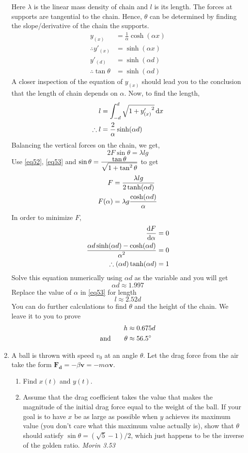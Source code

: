 \begin{enumerate}
Here $\lambda$ is the linear mass density of chain and $l$ is its length. The forces at supports are tangential to the chain. Hence, $\theta$ can be determined by finding the slope/derivative of the chain the supports.
\begin{align}
y_{(x)}&=\frac{1}{\alpha}\cosh(\alpha x) \nonumber\\
\therefore y'_{(x)}&=\sinh(\alpha x) \nonumber\\
y'_{(d)}&=\sinh(\alpha d) \nonumber\\
\therefore \tan \theta&=\sinh(\alpha d)		\label{eq52}
\end{align}
A closer inspection of the equation of $y_{(x)}$ should lead you to the conclusion that the length of chain depends on $\alpha$. Now, to find the length,
\begin{align}
l&=\int_{-d}^d \sqrt{1+{y'_{(x)}}^2} \mathop{}\!\mathrm{d} x \nonumber\\
\therefore l&=\frac{2}{\alpha} \sinh(\alpha d)		\label{eq53}
\end{align}
Balancing the vertical forces on the chain, we get,
\[
2F\sin\theta=\lambda lg
\]
Use \eqref{eq52}, \eqref{eq53} and $\sin\theta=\frac{\displaystyle \tan\theta}{\displaystyle \sqrt{1+\tan^2\theta}}$ to get
\begin{align*}
F&=\frac{\displaystyle \lambda lg}{\displaystyle 2\tanh(\alpha d)}\\
F(\alpha)&=\lambda g\frac{\displaystyle \cosh(\alpha d)}{\displaystyle \alpha}
\end{align*}
In order to minimize $F$,
\begin{align*}
\frac{\mathop{}\!\mathrm{d} F}{\mathop{}\!\mathrm{d} \alpha} &= 0\\
\frac{\displaystyle \alpha d\sinh(\alpha d)-\cosh(\alpha d)}{\displaystyle \alpha^2}&=0\\
\therefore (\alpha d)\tanh(\alpha d)&=1
\end{align*}
Solve this equation numerically using $\alpha d$ as the variable and you will get
\[
\alpha d \approx 1.997
\]
Replace the value of $\alpha$ in \eqref{eq53} for length
\[
l\approx 2.52d
\]
You can do further calculations to find $\theta$ and the height of the chain. We leave it to you to prove
\begin{align*}
h &\approx 0.675d\\
\text{and} \qquad \theta &\approx 56.5\degree
\end{align*}

\item A ball is thrown with speed $v_0$ at an angle $\theta$. Let the drag force from the air take the form $\bm{F_d}=-\beta\bm{v}=-m\alpha\bm{v}$.
\begin{enumerate}
\item Find $x{(t)}$ and $y{(t)}$.
\item Assume that the drag coefficient takes the value that makes the magnitude of the initial drag force equal to the weight of the ball. If your goal is to have $x$ be as large as possible when $y$ achieves its maximum value (you don't care what this maximum value actually is), show that $\theta$ should satisfy $\sin\theta=(\sqrt{5}-1)/2$, which just happens to be the inverse of the golden ratio. \hfill \textsl{Morin 3.53}
\end{enumerate}


\end{enumerate}
